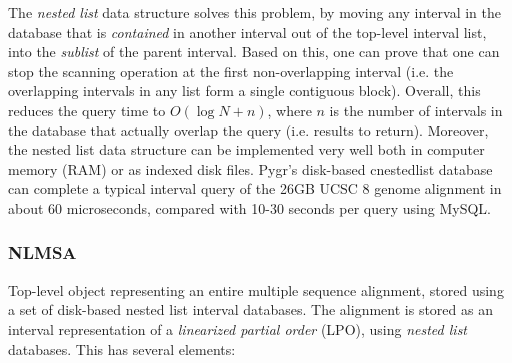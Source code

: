 \documentclass{howto}
\begin{document}
The {\em nested list} data structure solves this problem, by moving
any interval in the database that is {\em contained} in another interval
out of the top-level interval list, into the {\em sublist} of the
parent interval.  Based on this, one can prove that one can stop
the scanning operation at the first non-overlapping interval (i.e.
the overlapping intervals in any list form a single contiguous block).
Overall, this reduces the query time to $O(\log N + n)$, where $n$ is
the number of intervals in the database that actually overlap the 
query (i.e. results to return).  Moreover, the nested list data structure
can be implemented very well both in computer memory (RAM) or as indexed
disk files.  Pygr's disk-based cnestedlist database can complete
a typical interval query of the 26GB UCSC 8 genome alignment in
about 60 microseconds, compared with 10-30 seconds per query using
MySQL.

\subsubsection{NLMSA}
Top-level object representing an entire multiple sequence alignment, 
stored using a set of disk-based nested list interval databases.
The alignment is stored as an interval representation of a 
{\em linearized partial order} (LPO), using {\em nested list}
databases.  This has several elements:
\end{document}

